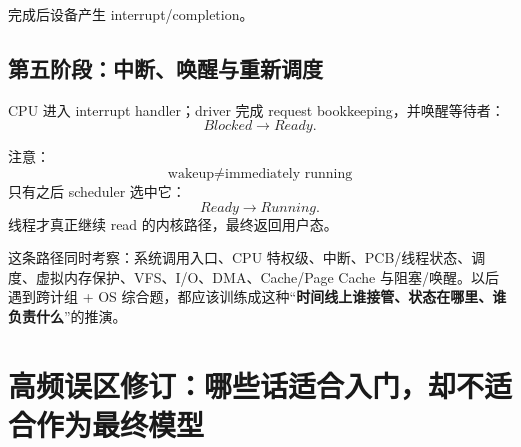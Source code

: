 \documentclass[11pt,a4paper]{ctexart}
\newcommand{\kw}[1]{\textbf{#1}}
\begin{document}
完成后设备产生 interrupt/completion。

\subsection{第五阶段：中断、唤醒与重新调度}
CPU 进入 interrupt handler；driver 完成 request bookkeeping，并唤醒等待者：
\[
Blocked\rightarrow Ready.
\]

注意：
\[
\boxed{\text{wakeup} \neq \text{immediately running}}
\]
只有之后 scheduler 选中它：
\[
Ready\rightarrow Running.
\]
线程才真正继续 read 的内核路径，最终返回用户态。

\begin{exam}
这条路径同时考察：系统调用入口、CPU 特权级、中断、PCB/线程状态、调度、虚拟内存保护、VFS、I/O、DMA、Cache/Page Cache 与阻塞/唤醒。以后遇到跨计组 + OS 综合题，都应该训练成这种“\kw{时间线上谁接管、状态在哪里、谁负责什么}”的推演。
\end{exam}

\section{高频误区修订：哪些话适合入门，却不适合作为最终模型}
\end{document}
